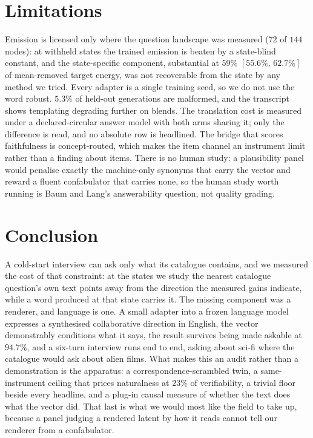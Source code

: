 \documentclass[11pt]{article}
\begin{document}
\section{Limitations}
\label{sec:limitations}

Emission is licensed only where the question landscape was measured ($72$ of $144$ nodes): at withheld
states the trained emission is beaten by a state-blind constant, and the state-specific component,
substantial at $59\%$ $[55.6\%,\,62.7\%]$ of mean-removed target energy, was not recoverable from the
state by any method we tried. Every adapter is a single training seed, so we do not use the word
robust. $5.3\%$ of held-out generations are malformed, and the transcript shows templating degrading
further on blends. The translation cost is measured under a declared-circular answer model with both
arms sharing it; only the difference is read, and no absolute row is headlined. The bridge that scores
faithfulness is concept-routed, which makes the item channel an instrument limit rather than a finding
about items. There is no human study: a plausibility panel would penalise exactly the machine-only
synonyms that carry the vector and reward a fluent confabulator that carries none, so the human study
worth running is Baum and Lang's answerability question, not quality grading.

\section{Conclusion}
\label{sec:conclusion}

A cold-start interview can ask only what its catalogue contains, and we measured the cost of that
constraint: at the states we study the nearest catalogue question's own text points away from the
direction the measured gains indicate, while a word produced at that state carries it. The missing
component was a renderer, and language is one. A small adapter into a frozen language model expresses
a synthesised collaborative direction in English, the vector demonstrably conditions what it says, the
result survives being made askable at $94.7\%$, and a six-turn interview runs end to end, asking about
sci-fi where the catalogue would ask about alien films. What makes this an audit rather than a
demonstration is the apparatus: a correspondence-scrambled twin, a same-instrument ceiling that prices
naturalness at $23\%$ of verifiability, a trivial floor beside every headline, and a plug-in causal
measure of whether the text does what the vector did. That last is what we would most like the field
to take up, because a panel judging a rendered latent by how it reads cannot tell our renderer from a
confabulator.

{\footnotesize

}
\end{document}
